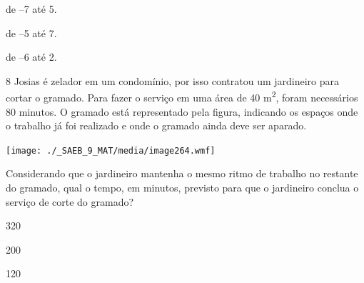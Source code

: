 \begin{escolha}
\begin{escolha}
\begin{escolha}
\begin{escolha}
{\begin{boxmedio}
\begin{boxpeq}
\begin{q°}
\begin{boxmedio}
\begin{boxpeq}
\begin{boxpeq}
\begin{boxmedio}
\begin{boxmedio}
\begin{boxmedio}
\begin{largebox}
\begin{boxmedio}
{\begin{escolha}
\begin{escolha}
\begin{escolha}
\begin{escolha}
\begin{escolha}
\begin{escolha}
\begin{escolha}
  \item de --7 até 5. 

  \item de --5 até 7. 

  \item de --6 até 2.

\end{escolha}


\num{8} Josias é zelador em um condomínio, por isso contratou um jardineiro
para cortar o gramado. Para fazer o serviço em uma área de 
40 m\textsuperscript{2}, foram necessários 80 minutos. O gramado está
representado pela figura, indicando os espaços onde o trabalho já foi
realizado e onde o gramado ainda deve ser aparado.

\texttt{[image: ./\_SAEB\_9\_MAT/media/image264.wmf]}

Considerando que o jardineiro mantenha o mesmo ritmo de trabalho no
restante do gramado, qual o tempo, em minutos, previsto para que o
jardineiro conclua o serviço de corte do gramado?

\begin{escolha}

  \item 320

  \item 200

  \item 120


\end{escolha}
\end{escolha}
\end{escolha}
\end{escolha}
\end{escolha}
\end{escolha}
\end{escolha}}
\end{boxmedio}
\end{largebox}
\end{boxmedio}
\end{boxmedio}
\end{boxmedio}
\end{boxpeq}
\end{boxpeq}
\end{boxmedio}
\end{q°}
\end{boxpeq}
\end{boxmedio}}
\end{escolha}
\end{escolha}
\end{escolha}
\end{escolha}
